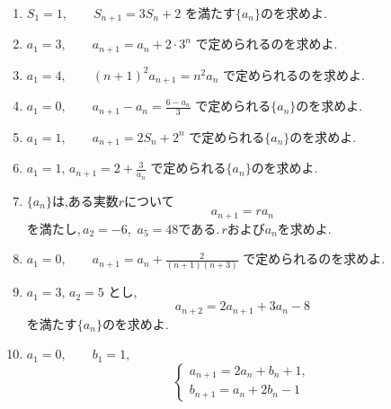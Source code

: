 \begin{enumerate}[label=\textbf{問\arabic*.},leftmargin=3.8em,format=\bookitemlink{practice-basic}{problem}{answer}]
          \item $\displaystyle S_1=1,\qquad S_{n+1}=3S_n+2$
                                を満たす$\{a_n\}$のを求めよ.
          \item $\displaystyle a_1=3,\qquad a_{n+1}=a_n+2\cdot3^n$
                で定められるのを求めよ.
          \item $\displaystyle a_1=4,\qquad (n+1)^2a_{n+1}=n^2a_n$
                で定められるのを求めよ.
          \item $\displaystyle a_1=0,\qquad a_{n+1}-a_n=\frac{6-a_n}{3}$
                で定められる$\{a_n\}$のを求めよ.
          \item $\displaystyle a_1=1,\qquad a_{n+1}=2S_n+2^n$
                                で定められる$\{a_n\}$のを求めよ.
          \item $\displaystyle a_1=1,\,a_{n+1}=2+\frac3{a_n}$
                で定められる$\{a_n\}$のを求めよ.
          \item {}$\{a_n\}$は,ある実数$r$について
                \[
                  a_{n+1}=ra_n
                \]
                を満たし,\,$a_2=-6$,\, $a_5=48$である.\,$r$および$a_n$を求めよ.
          \item $\displaystyle a_1=0,\qquad a_{n+1}=a_n+\frac{2}{(n+1)(n+3)}$
                で定められるのを求めよ.
          \item $\displaystyle a_1=3,\,a_2=5$ とし,
                \[
                  a_{n+2}=2a_{n+1}+3a_n-8
                \]
                を満たす$\{a_n\}$のを求めよ.
          \item $\displaystyle a_1=0,\qquad b_1=1,$
                            \[
                              \begin{cases}
                                a_{n+1}=2a_n+b_n+1,\\
                                b_{n+1}=a_n+2b_n-1
                              \end{cases}
                            \]

\end{enumerate}

